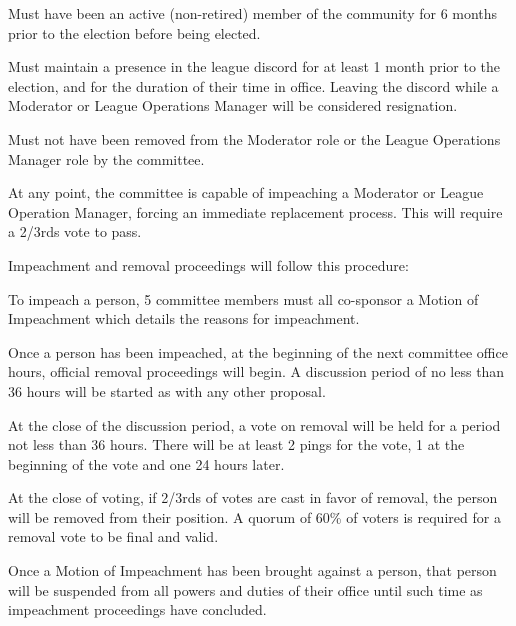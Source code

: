 \begin{deepEnumerate}
	\begin{deepEnumerate}
		\item Must have been an active (non-retired) member of the community for 6 months prior to the election before being elected.
		\item Must maintain a presence in the league discord for at least 1 month prior to the election, and for the duration of their time in office. 
		Leaving the discord while a Moderator or League Operations Manager will be considered resignation.
		\item Must not have been removed from the Moderator role or the League Operations Manager role by the committee.	
	\end{deepEnumerate}
	\item At any point, the committee is capable of impeaching a Moderator or League Operation Manager, forcing an immediate replacement process.
	This will require a 2/3rds vote to pass.
	\begin{deepEnumerate}
		\item Impeachment and removal proceedings will follow this procedure:
		\begin{deepEnumerate}
			\item To impeach a person, 5 committee members must all co-sponsor a Motion of Impeachment which details the reasons for impeachment.
			\item Once a person has been impeached, at the beginning of the next committee office hours, official removal proceedings will begin. 
			A discussion period of no less than 36 hours will be started as with any other proposal.
			\item At the close of the discussion period, a vote on removal will be held for a period not less than 36 hours. 
			There will be at least 2 pings for the vote, 1 at the beginning of the vote and one 24 hours later.
			\item At the close of voting, if 2/3rds of votes are cast in favor of removal, the person will be removed from their position. 
			A quorum of 60\% of voters is required for a removal vote to be final and valid.
		\end{deepEnumerate}
		\item Once a Motion of Impeachment has been brought against a person, that person will be suspended from all powers and duties of their office 
		until such time as impeachment proceedings have concluded.
	\end{deepEnumerate}
\end{deepEnumerate}

